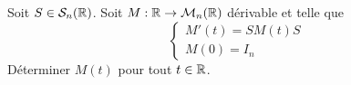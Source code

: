 \begin{exo}
    Soit $S\in\mathcal S_n(\operatorname{\mathbb R})$.
    Soit $M:\operatorname{\mathbb R}\to\mathcal M_n(\operatorname{\mathbb R})$ dérivable et telle que 
    \[
        \left\lbrace \begin{array}{c} M'(t)=SM(t)S\\ M(0) = I_n\end{array}\right.    
    \]
    Déterminer $M(t)$ pour tout $t\in\operatorname{\mathbb R}$.
\end{exo}